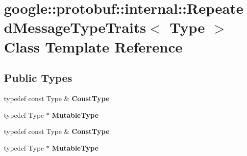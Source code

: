 \hypertarget{classgoogle_1_1protobuf_1_1internal_1_1RepeatedMessageTypeTraits}{}\section{google\+:\+:protobuf\+:\+:internal\+:\+:Repeated\+Message\+Type\+Traits$<$ Type $>$ Class Template Reference}
\label{classgoogle_1_1protobuf_1_1internal_1_1RepeatedMessageTypeTraits}
\subsection*{Public Types}
\begin{DoxyCompactItemize}
\item 
\mbox{\label{classgoogle_1_1protobuf_1_1internal_1_1RepeatedMessageTypeTraits_aef19f8b73d15b7572f1433c8723d73c1}} 
typedef const Type \& {\bfseries Const\+Type}
\item 
\mbox{\label{classgoogle_1_1protobuf_1_1internal_1_1RepeatedMessageTypeTraits_ad10279097d8fd36e262246872ca462ed}} 
typedef Type $\ast$ {\bfseries Mutable\+Type}
\item 
\mbox{\label{classgoogle_1_1protobuf_1_1internal_1_1RepeatedMessageTypeTraits_aef19f8b73d15b7572f1433c8723d73c1}} 
typedef const Type \& {\bfseries Const\+Type}
\item 
\mbox{\label{classgoogle_1_1protobuf_1_1internal_1_1RepeatedMessageTypeTraits_ad10279097d8fd36e262246872ca462ed}} 
typedef Type $\ast$ {\bfseries Mutable\+Type}
\end{DoxyCompactItemize}
